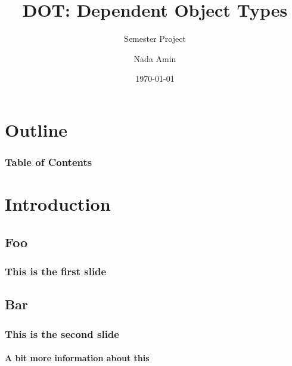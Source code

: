 \documentclass{beamer}
\title{DOT: Dependent Object Types}
\subtitle{Semester Project}
\author{Nada Amin}
\institute{Ecole Polytechnique F\'ed\'erale de Lausanne}
\date{\today}
\begin{document}
\frame{\titlepage}

\section*{Outline}
\begin{frame}
\frametitle{Table of Contents}
\tableofcontents[currentsection]
\end{frame}

\section{Introduction}
\subsection{Foo}

  \begin{frame}
    \frametitle{This is the first slide}
  \end{frame}

\subsection{Bar}

  \begin{frame}
    \frametitle{This is the second slide}
    \framesubtitle{A bit more information about this}
  \end{frame}
\end{document}
